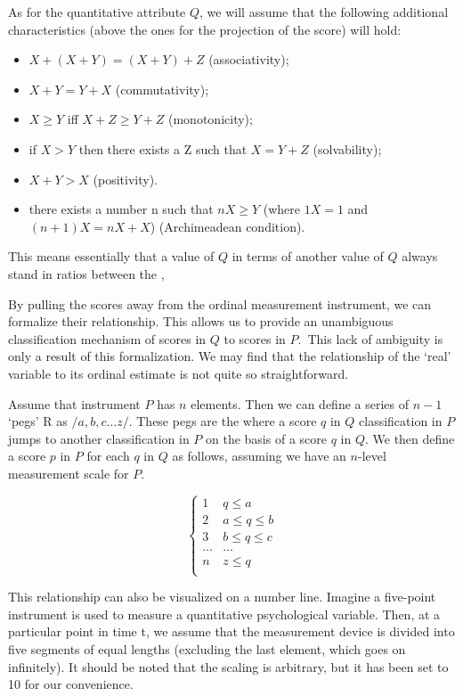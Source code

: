 \documentclass[utf8]{FrontiersinVancouver}
\begin{document}
As for the quantitative attribute $Q$, we will assume that the following additional characteristics (above the ones for the projection of the score) will hold:

\begin{itemize}
    \item $X + (X + Y) = (X + Y) + Z$ (associativity);
    \item $X + Y = Y + X$ (commutativity);
    \item $X \geq Y$ iff $X + Z \geq Y + Z$ (monotonicity);
    \item if $X > Y$ then there exists a Z such that $X = Y + Z$ (solvability);
    \item $X + Y > X$ (positivity).
    \item there exists a number n such that $nX \geq Y$ (where $1X = 1$ and $(n + 1) X = nX + X$) (Archimeadean condition).
\end{itemize}

This means essentially that a value of $Q$ in terms of another value of $Q$ always stand in ratios between the , 

By pulling the scores away from the ordinal measurement instrument, we can formalize their relationship. This allows us to provide an unambiguous classification mechanism of scores in $Q$ to scores in $P$.\ This lack of ambiguity is only a result of this formalization. We may find that the relationship of the `real' variable to its ordinal estimate is not quite so straightforward. 

Assume that instrument $P$ has $n$ elements. Then we can define a series of $n - 1$ `pegs' R as $/{a, b, c \ldots z/}$. These pegs are the where a score $q$ in $Q$ classification in $P$ jumps to another classification in $P$ on the basis of a score $q$ in $Q$. We then define a score $p$ in $P$ for each $q$ in $Q$ as follows, assuming we have an $n$-level measurement scale for $P$.

\[
\begin{cases} 
    1 & q \leq a\\
    2 & a \leq q \leq b\\
    3 & b \leq q \leq c\\
    \ldots & \ldots\\    
    n & z\leq q\\
\end{cases}
\]

This relationship can also be visualized on a number line. Imagine a five-point instrument is used to measure a quantitative psychological variable. Then, at a particular point in time t, we assume that the measurement device is divided into five segments of equal lengths (excluding the last element, which goes on infinitely). It should be noted that the scaling is arbitrary, but it has been set to 10 for our convenience.
\end{document}
